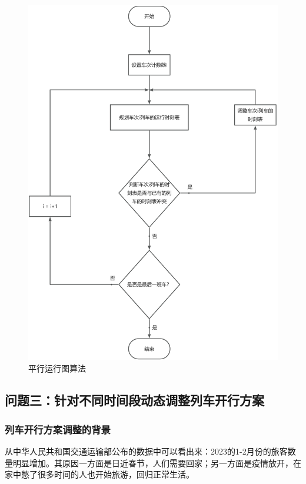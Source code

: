 \begin{figure}[h]
    \centering
    \includegraphics[scale=0.2]{res/figure170309.png}
    \caption{平行运行图算法}
    \label{figure170309}
\end{figure}

\subsection{问题三：针对不同时间段动态调整列车开行方案}

\subsubsection{列车开行方案调整的背景}

从中华人民共和国交通运输部公布的数据中可以看出来：2023的1-2月份的旅客数量明显增加\cite{ChengShiKeYunTongJiShuJuZhongHuaRenMinGongHeGuoJiaoTongYunShuBu}。其原因一方面是日近春节，人们需要回家；另一方面是疫情放开，在家中憋了很多时间的人也开始旅游，回归正常生活。

